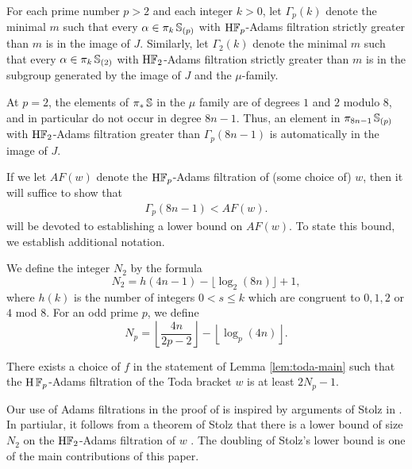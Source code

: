 \begin{dfn} \label{dfn:h}
  For each prime number $p>2$ and each integer $k>0$, let $\Gamma_p(k)$ denote the minimal $m$ such that every $\alpha \in \pi_{k}\operatorname{\mathbb{S}}_{(p)}$ with $\mathrm{H}\mathbb{F}_p$-Adams filtration strictly greater than $m$ is in the image of $J$.
  Similarly, let $\Gamma_2(k)$ denote the minimal $m$ such that every $\alpha \in \pi_{k}\operatorname{\mathbb{S}}_{(2)}$ with $\mathrm{H}\mathbb{F}_2$-Adams filtration strictly greater than $m$ is in the subgroup generated by the image of $J$ and the $\mu$-family.
\end{dfn}

\begin{rmk}
At $p=2$, the elements of $\pi_*\operatorname{\mathbb{S}}$ in the $\mu$ family are of degrees $1$ and $2$ modulo $8$, and in particular do not occur in degree $8n-1$.  Thus, an element in $\pi_{8n-1}\operatorname{\mathbb{S}}_{(p)}$ with $\mathrm{H}\mathbb{F}_2$-Adams filtration greater than $\Gamma_p(8n-1)$ is automatically in the image of $J$.
\end{rmk}

If we let $AF(w)$ denote the $\mathrm{H}\mathbb{F}_p$-Adams filtration of (some choice of) $w$, then it will suffice to show that
\begin{align}\label{eqn:BIG} \Gamma_p (8n-1) < AF(w). \end{align}
 will be devoted to establishing a lower bound on $AF(w)$. To state this bound, we establish additional notation.

\begin{dfn}
We define the integer $N_2$ by the formula
\[N_2 = h(4n-1) - \lfloor \log_2 (8n) \rfloor + 1,\]
where $h(k)$ is the number of integers $0 < s \leq k$ which are congruent to $0,1,2$ or $4$ mod $8$.
For an odd prime $p$, we define 
\[N_p = \left\lfloor \frac{4n}{2p-2} \right\rfloor - \left\lfloor \log_p (4n) \right\rfloor.\]
\end{dfn}

\begin{thm}\label{thm:filt-bound-finale}
There exists a choice of $f$ in the statement of Lemma \ref{lem:toda-main} such that the $\mathrm{H}\operatorname{\mathbb{F}}_p$-Adams filtration of the Toda bracket $w$ is at least $2N_p-1$.
\end{thm}


\begin{rmk}
  Our use of Adams filtrations in the proof of  is inspired by arguments of Stolz in \cite{StolzBook}. 
  In partiular, it follows from a theorem of Stolz that there is a lower bound of size $N_2$ on the $\mathrm{H}\mathbb{F}_2$-Adams filtration of $w$ \cite[Satz 12.7]{StolzBook}.
  The doubling of Stolz's lower bound is one of the main contributions of this paper.
\end{rmk}


